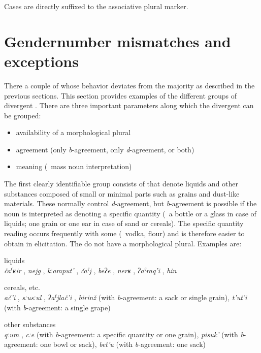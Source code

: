 Cases are directly suffixed to the associative plural marker.



\section{Gender\tnd number mismatches and exceptions}
\label{sec:Gendernumbermismatchesandexceptions}

There a couple of  whose behavior deviates from the majority as described in the previous sections. This section provides examples of the different groups of divergent . There are three important parameters along which the divergent  can be grouped:
%
\begin{itemize}
	\item availability of a morphological plural
	\item {} agreement (only \textit{b}-agreement, only \textit{d}-agreement, or both)
	\item meaning (\teg\ mass noun interpretation)
\end{itemize}
%

The first clearly identifiable group consists of  that denote liquids and other substances composed of small or minimal parts such as grains and dust-like materials. These  normally control \textit{d}-agreement, but \textit{b}-agreement is possible if the noun is interpreted as denoting a specific quantity (\teg\ a bottle or a glass in case of liquids; one grain or one ear in case of sand or cereals). The specific quantity reading occurs frequently with some  (\teg\ vodka, flour) and is therefore easier to obtain in elicitation. The  do not have a morphological plural. Examples are:
%
\begin{exe}
	\ex	liquids\\
		\textit{čaˁʁir} , \textit{nejg} , \textit{kːamput'} , \textit{čaˁj} , \textit{beʔe} , \textit{nerʁ} , \textit{ʡaˁraq'i} , \textit{hin} 

	\ex	cereals, etc. \\
		\textit{ač'i} , \textit{sːusːul} , \textit{ʡaˁjlač'i} , \textit{birinž}  (with \textit{b}-agreement: a sack or single grain), \textit{t'ut'i}  (with \textit{b}-agreement: a single grape)
	
	\ex	other substances\\
		\textit{qːum} , \textit{cːe}  (with \textit{b}-agreement: a specific quantity or one grain), \textit{pisuk'}  (with \textit{b}-agreement: one bowl or sack), \textit{bet'u}  (with \textit{b}-agreement: one sack)
\end{exe}

